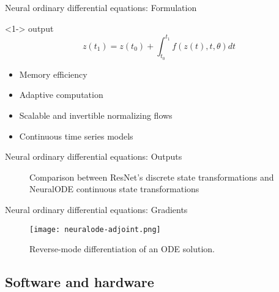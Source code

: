 \begin{frame}{Neural ordinary differential equations: Formulation}

    \begin{block}<1->{ output}
        \begin{equation*}
            z(t_1) = z(t_0) + \int_{t_0}^{t_1}{f(z(t), t, \theta)dt}
        \end{equation*}
    \end{block}

    \begin{itemize}
        \item<2-> Memory efficiency
        \item<3-> Adaptive computation
        \item<4-> Scalable and invertible normalizing flows
        \item<5-> Continuous time series models
    \end{itemize}
\end{frame}

\begin{frame}{Neural ordinary differential equations: Outputs}
    \begin{figure}[h]
        \centering
        \caption{Comparison between ResNet's discrete state transformations and \gls{NeuralODE} continuous state transformations}
        \label{fig:resnet-vs-odenet}
    \end{figure}
\end{frame}

\begin{frame}{Neural ordinary differential equations: Gradients}
    \begin{figure}[h]
        \centering
        \texttt{[image: neuralode-adjoint.png]}
        \caption{Reverse-mode differentiation of an \gls{ODE} solution. \cite{chenNeuralOrdinaryDifferential2019}}
        \label{fig:neuralode-adjoint}
    \end{figure}
\end{frame}

\subsection{Software and hardware}

